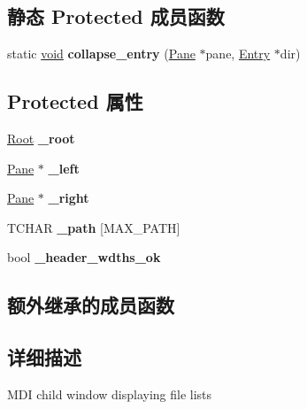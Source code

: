 \subsection*{静态 Protected 成员函数}
\begin{DoxyCompactItemize}
\item 
\mbox{\label{struct_file_child_window_aa8a7bae9193d29e96947c6934d1f908f}} 
static \hyperlink{interfacevoid}{void} {\bfseries collapse\+\_\+entry} (\hyperlink{struct_pane}{Pane} $\ast$pane, \hyperlink{struct_entry}{Entry} $\ast$dir)
\end{DoxyCompactItemize}
\subsection*{Protected 属性}
\begin{DoxyCompactItemize}
\item 
\mbox{\label{struct_file_child_window_a2d1ef937886696a3eb293917abad904d}} 
\hyperlink{struct_root}{Root} {\bfseries \+\_\+root}
\item 
\mbox{\label{struct_file_child_window_ac2f0b60d2ae1ea6fef5ffc9671216955}} 
\hyperlink{struct_pane}{Pane} $\ast$ {\bfseries \+\_\+left}
\item 
\mbox{\label{struct_file_child_window_a7425dbe2c45d8a1ffb7024bcfe8d96d3}} 
\hyperlink{struct_pane}{Pane} $\ast$ {\bfseries \+\_\+right}
\item 
\mbox{\label{struct_file_child_window_a15aad34e55f50b839cb0be378f573452}} 
T\+C\+H\+AR {\bfseries \+\_\+path} \mbox{[}M\+A\+X\+\_\+\+P\+A\+TH\mbox{]}
\item 
\mbox{\label{struct_file_child_window_a8b09ed32f46ab7f8f391f37c772d3a8c}} 
bool {\bfseries \+\_\+header\+\_\+wdths\+\_\+ok}
\end{DoxyCompactItemize}
\subsection*{额外继承的成员函数}


\subsection{详细描述}
M\+DI child window displaying file lists 

